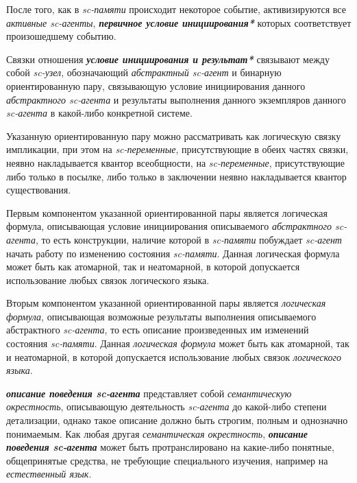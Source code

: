 После того, как в \textit{sc-памяти} происходит некоторое событие, активизируются все \textit{активные sc-агенты}, \textbf{\textit{первичное условие инициирования*}} которых соответствует произошедшему событию.

Связки отношения \textbf{\textit{условие инициирования и результат*}} связывают между собой \textit{sc-узел}, обозначающий \textit{абстрактный sc-агент} и бинарную ориентированную пару, связывающую условие инициирования данного \textit{абстрактного sc-агента} и результаты выполнения данного экземпляров данного \textit{sc-агента} в какой-либо конкретной системе.
	
Указанную ориентированную пару можно рассматривать как логическую связку импликации, при этом на \textit{sc-переменные}, присутствующие в обеих частях связки, неявно накладывается квантор всеобщности, на \textit{sc-переменные}, присутствующие либо только в посылке, либо только в заключении неявно накладывается квантор существования.

Первым компонентом указанной ориентированной пары является логическая формула, описывающая условие инициирования описываемого \textit{абстрактного sc-агента}, то есть конструкции, наличие которой в \textit{sc-памяти} побуждает \textit{sc-агент} начать работу по изменению состояния \textit{sc-памяти}. Данная логическая формула может быть как атомарной, так и неатомарной, в которой допускается использование любых связок логического языка.

Вторым компонентом указанной ориентированной пары является \textit{логическая формула}, описывающая возможные результаты выполнения описываемого абстрактного \textit{sc-агента}, то есть описание произведенных им изменений состояния \textit{sc-памяти}. Данная \textit{логическая формула} может быть как атомарной, так и неатомарной, в которой допускается использование любых связок \textit{логического языка}.

\begin{SCn}
\end{SCn}

\textbf{\textit{описание поведения sc-агента}} представляет собой \textit{семантическую окрестность}, описывающую деятельность \textit{sc-агента} до какой-либо степени детализации, однако такое описание должно быть строгим, полным и однозначно понимаемым. Как любая другая \textit{семантическая окрестность}, \textbf{\textit{описание поведения sc-агента}} может быть протранслировано на какие-либо понятные, общепринятые средства, не требующие специального изучения, например на \textit{естественный язык}.

